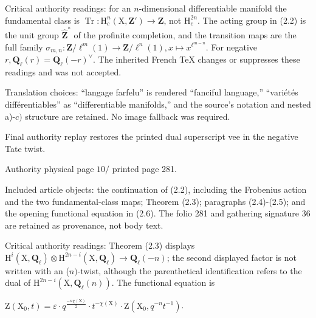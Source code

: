 \documentclass[10pt,leqno]{article}
\begin{document}
\noindent Critical authority readings: for an \(n\)-dimensional differentiable manifold the fundamental class is \(\operatorname{Tr}:\mathrm{H}_{c}^{n}(\mathrm{X},\mathbf{Z}')\longrightarrow \mathbf{Z}\), not \(\mathrm{H}_{c}^{2n}\). The acting group in (2.2) is the unit group \(\widehat{\mathbf{Z}}^{*}\) of the profinite completion, and the transition maps are the full family \(\sigma _{m,n}:\mathbf{Z}/\ell ^{m}(1)\longrightarrow \mathbf{Z}/\ell ^{n}(1), x\longmapsto x^{\ell ^{m- n}}\). For negative \(r, \mathbf{Q}_{\ell }(r)=\mathbf{Q}_{\ell }(- r)^{\vee }\). The inherited French TeX changes or suppresses these readings and was not accepted.\par

\noindent Translation choices: “langage farfelu” is rendered “fanciful language,” “variétés différentiables” as “differentiable manifolds,” and the source’s notation and nested a)-\(c)\) structure are retained. No image fallback was required.\par

\noindent Final authority replay restores the printed dual superscript vee in the negative Tate twist.\par

\clearpage

\label{physical-10}\par\smallskip

\noindent Authority physical page \(10 /\) printed page 281.\par

\noindent Included article objects: the continuation of (2.2), including the Frobenius action and the two fundamental-class maps; Theorem (2.3); paragraphs (2.4)-(2.5); and the opening functional equation in (2.6). The folio 281 and gathering signature 36 are retained as provenance, not body text.\par

\noindent Critical authority readings: Theorem (2.3) displays \(\mathrm{H}^{i}(\mathrm{X},\mathbf{Q}_{\ell })\otimes \mathrm{H}^{2n- i}(\mathrm{X},\mathbf{Q}_{\ell })\longrightarrow \mathbf{Q}_{\ell }(- n)\); the second displayed factor is not written with an (\(n)\)-twist, although the parenthetical identification refers to the dual of \(\mathrm{H}^{2n- i}(\mathrm{X},\mathbf{Q}_{\ell }(n))\). The functional equation is\par

\noindent \(\mathrm{Z}(\mathrm{X}_{0},t)=\varepsilon \cdot q^{\frac{-n\chi(\mathrm{X})}{2}}\cdot t^{- \chi (\mathrm{X})}\cdot \mathrm{Z}(\mathrm{X}_{0},q^{- n}t^{- 1})\).\par
\end{document}
